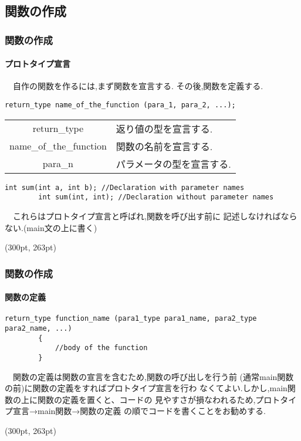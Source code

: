 \documentclass[dvipdfmx]{beamer}
\begin{document}
\subsection{関数の作成}
\begin{frame}[t, fragile]
    \frametitle{関数の作成}
    \framesubtitle{プロトタイプ宣言}
    　自作の関数を作るには,まず関数を宣言する.
    その後,関数を定義する.
    \begin{lstlisting}[gobble=8, 
        caption=Syntax\space of\space function\space declaration]
        return_type name_of_the_function (para_1, para_2, ...);
    \end{lstlisting}
    \begin{table}
    \centering
        \begin{tabular}{cl}
            \hline
            return\_type & 返り値の型を宣言する.\\
            name\_of\_the\_function & 関数の名前を宣言する.\\
            para\_n & パラメータの型を宣言する.\\
            \hline
        \end{tabular}
    \end{table}
    \begin{lstlisting}[gobble=8, 
        caption=Example\space of \space function\space declaration]
        int sum(int a, int b); //Declaration with parameter names
        int sum(int, int); //Declaration without parameter names
    \end{lstlisting}
    　これらはプロトタイプ宣言と呼ばれ,関数を呼び出す前に
    記述しなければならない.(main文の上に書く)
    \begin{textblock*}{0.3\linewidth}(300pt, 263pt)
    \space
    \end{textblock*}
\end{frame}

\begin{frame}[t, fragile]
	\frametitle{関数の作成}
	\framesubtitle{関数の定義}
	\begin{lstlisting}[gobble=8, caption=Syntax\space of\space function
        \space definition]
        return_type function_name (para1_type para1_name, para2_type para2_name, ...)
        {
            //body of the function
        }
    \end{lstlisting}
    　関数の定義は関数の宣言を含むため,関数の呼び出しを行う前
        (通常main関数の前)に関数の定義をすればプロトタイプ宣言を行わ
        なくてよい.しかし,main関数の上に関数の定義を置くと、コードの
        見やすさが損なわれるため,プロトタイプ宣言→main関数→関数の定義
        の順でコードを書くことをお勧めする.
    \begin{textblock*}{0.3\linewidth}(300pt, 263pt)
    \space
    \end{textblock*}
\end{frame}
\end{document}
